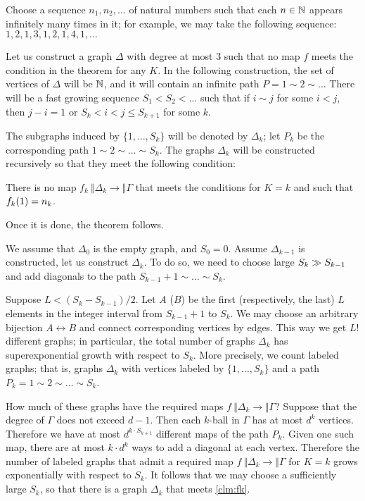 \documentclass[a4paper,10pt]{article}
\begin{document}
Choose a sequence $n_1,n_2,\dots$ of natural numbers such that each $n\in \mathbb{N}$ appears infinitely many times in it;
for example, we may take the following sequence: $1, 2, 1, 3, 1, 2, 1, 4, 1,\dots$

Let us construct a graph $\Delta$ with degree at most $3$ such that no map $f$ meets the condition in the theorem for any $K$.
In the following construction, the set of vertices of $\Delta$ will be $\mathbb{N}$, and it will contain an infinite path $P=1\sim 2\sim \dots$
There will be a fast growing sequence $S_1<S_2<\dots$ such that 
if $i\sim j$ for some $i<j$, then $j-i=1$ or $S_k<i<j\le S_{k+1}$ for some $k$.

The subgraphs induced by $\{1,\dots, S_k\}$ will be denoted by $\Delta_k$;
let $P_k$ be the corresponding path $1\sim 2\sim \dots \sim S_k$.
The graphs $\Delta_k$ will be constructed recursively so that they meet the following condition:
\begin{clm}{}\label{clm:fk}
There is no map $f_k\:\Vert \Delta_k\to \Vert \Gamma$ that meets the conditions for $K=k$ and such that $f_k(1)\z=n_k$.
\end{clm}
Once it is done, the theorem follows. 

We assume that $\Delta_0$ is the empty graph, and $S_0=0$.
Assume $\Delta_{k-1}$ is constructed, let us  construct $\Delta_k$.
To do so, we need to choose large $S_k\z\gg S_{k-1}$ and add diagonals to the path $S_{k-1}+1\sim\dots\sim S_k$.

Suppose $L<(S_k-S_{k-1})/2$.
Let $A$ ($B$) be the first (respectively, the last) $L$ elements in the integer interval from $S_{k-1}+1$ to $S_k$.
We may choose an arbitrary bijection $A\leftrightarrow B$ and connect corresponding vertices by edges.
This way we get $L!$ different graphs; in particular, the total number of graphs $\Delta_k$ has superexponential growth with respect to $S_k$.
More precisely, we count labeled graphs; that is, graphs $\Delta_k$ with vertices labeled by $\{1,\dots,S_k\}$ and a path $P_k=1\sim 2\sim\dots\sim S_k$.

How much of these graphs have the required maps $f\:\Vert \Delta_k\to \Vert \Gamma$?
Suppose that the degree of $\Gamma$ does not exceed $d-1$.
Then each $k$-ball in $\Gamma$ has at most $d^k$ vertices.
Therefore we have at most $d^{k\cdot S_{k+1}}$ different maps of the path $P_k$.
Given one such map, there are at most $k\cdot d^k$ ways to add a diagonal at each vertex.
Therefore the number of labeled graphs that admit a required map $f\:\Vert \Delta_k\to \Vert \Gamma$ for $K=k$ grows exponentially with respect to $S_k$.
It follows that we may choose a sufficiently large $S_k$,
so that there is a graph $\Delta_k$ that meets \ref{clm:fk}.
\qeds
\end{document}
